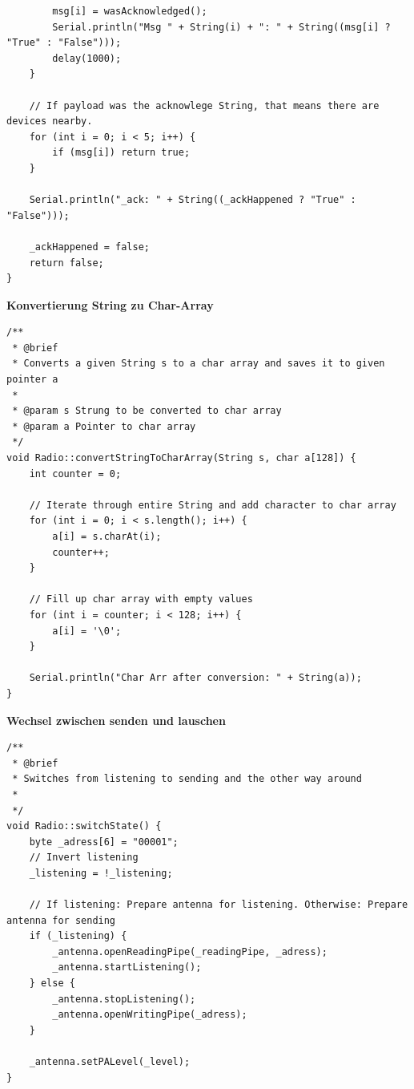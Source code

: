 \documentclass[a4paper, 11pt]{scrartcl}
\begin{document}
\begin{small}
\begin{lstlisting}
        msg[i] = wasAcknowledged();
        Serial.println("Msg " + String(i) + ": " + String((msg[i] ? "True" : "False")));
        delay(1000);
    }

    // If payload was the acknowlege String, that means there are devices nearby.
    for (int i = 0; i < 5; i++) {
        if (msg[i]) return true; 
    }
    
    Serial.println("_ack: " + String((_ackHappened ? "True" : "False")));
    
    _ackHappened = false;
    return false;
}
\end{lstlisting}

\begin{flushleft}\textbf{Konvertierung String zu Char-Array}\label{code:transpose_s_to_arr}\end{flushleft}
\begin{lstlisting}
/**
 * @brief
 * Converts a given String s to a char array and saves it to given pointer a
 * 
 * @param s Strung to be converted to char array
 * @param a Pointer to char array
 */
void Radio::convertStringToCharArray(String s, char a[128]) {
    int counter = 0;

    // Iterate through entire String and add character to char array
    for (int i = 0; i < s.length(); i++) {
        a[i] = s.charAt(i);
        counter++;
    }

    // Fill up char array with empty values
    for (int i = counter; i < 128; i++) {
        a[i] = '\0';
    }

    Serial.println("Char Arr after conversion: " + String(a));
}
\end{lstlisting}

\begin{flushleft}\textbf{Wechsel zwischen senden und lauschen}\label{code:switch}\end{flushleft}
\begin{lstlisting}
/**
 * @brief 
 * Switches from listening to sending and the other way around
 * 
 */
void Radio::switchState() {
    byte _adress[6] = "00001";
    // Invert listening
    _listening = !_listening;

    // If listening: Prepare antenna for listening. Otherwise: Prepare antenna for sending
    if (_listening) {
        _antenna.openReadingPipe(_readingPipe, _adress);
        _antenna.startListening();
    } else {
        _antenna.stopListening();
        _antenna.openWritingPipe(_adress);
    }

    _antenna.setPALevel(_level);
}
\end{lstlisting}


\end{small}
\end{document}

